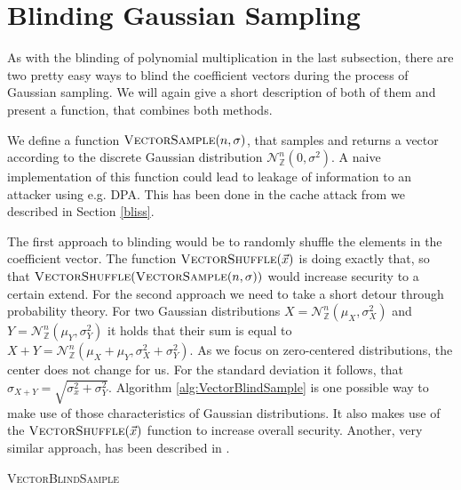 \section{Blinding Gaussian Sampling}
As with the blinding of polynomial multiplication in the last subsection, there are two pretty easy ways to blind the coefficient vectors during the process of Gaussian sampling. We will again give a short description of both of them and present a function, that combines both methods.

We define a function \(\textsc{VectorSample}(n,\sigma)\), that samples and returns a vector according to the discrete Gaussian distribution \(\mathcal{N}_\mathbb{Z}^{n} (0, \sigma^2)\). A naive implementation of this function could lead to leakage of information to an attacker using e.g. DPA. This has been done in the cache attack from \cite{cryptoeprint:2016:300} we described in Section \ref{bliss}.

The first approach to blinding would be to randomly shuffle the elements in the coefficient vector. The function \(\textsc{VectorShuffle}(\vec{x})\) is doing exactly that, so that \(\textsc{VectorShuffle}(\textsc{VectorSample}(n,\sigma))\) would increase security to a certain extend. For the second approach we need to take a short detour through probability theory. For two Gaussian distributions \(X=\mathcal{N}_\mathbb{Z}^{n} (\mu_X, \sigma^2_X)\) and \(Y=\mathcal{N}_\mathbb{Z}^{n} (\mu_Y, \sigma^2_Y)\) it holds that their sum is equal to \(X+Y=\mathcal{N}_\mathbb{Z}^{n} (\mu_X+\mu_Y, \sigma^2_X+\sigma^2_Y)\). As we focus on zero-centered distributions, the center does not change for us. For the standard deviation it follows, that \(\sigma_{X+Y}=\sqrt{\sigma^2_x+\sigma^2_Y}\). Algorithm \ref{alg:VectorBlindSample} is one possible way to make use of those characteristics of Gaussian distributions. It also makes use of the \(\textsc{VectorShuffle}(\vec{x})\) function to increase overall security. Another, very similar approach, has been described in \cite{cryptoeprint:2014:254}.


\begin{algorithm}
    \caption{\textsc{VectorBlindSample}}
    \label{alg:VectorBlindSample}
    \begin{algorithmic}[1]
        \EndFor\\
    \end{algorithmic}
\end{algorithm}